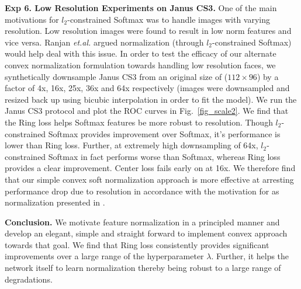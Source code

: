\documentclass[10pt,twocolumn,letterpaper]{article}
\begin{document}
\textbf{Exp 6. Low Resolution Experiments on Janus CS3. } One of the main motivations for $l_2$-constrained Softmax was to handle images with varying resolution. Low resolution images were found to result in low norm features and vice versa. Ranjan \emph{et.al.}  \cite{ranjan2017l2} argued normalization (through $l_2$-constrained Softmax) would help deal with this issue. In order to test the efficacy of our alternate convex normalization formulation towards handling low resolution faces, we synthetically downsample Janus CS3 from an original size of ($112\times 96$) by a factor of 4x, 16x, 25x, 36x and 64x respectively (images were downsampled and resized back up using bicubic interpolation in order to fit the model). We run the Janus CS3 protocol and plot the ROC curves in Fig.~\ref{fig_scale2}. We find that the Ring loss helps Softmax features be more robust to resolution. Though $l_2$-constrained Softmax provides improvement over Softmax, it's performance is lower than Ring loss. Further, at extremely high downsampling of 64x, $l_2$-constrained Softmax in fact performs worse than Softmax, whereas Ring loss provides a clear improvement. Center loss fails early on at 16x. We therefore find that our simple convex soft normalization approach is more effective at arresting performance drop due to resolution in accordance with the motivation for as normalization presented in \cite{ranjan2017l2}.




\textbf{Conclusion.} We motivate feature normalization in a principled manner and develop an elegant, simple and straight forward to implement convex approach towards that goal. We find that Ring loss consistently provides significant improvements over a large range of the hyperparameter $\lambda$. Further, it helps the network itself to learn normalization thereby being robust to a large range of degradations.










{\small


}
\end{document}
